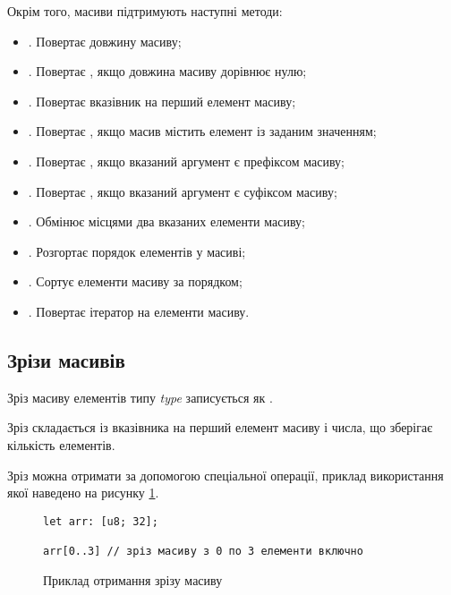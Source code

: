 \documentclass[main.tex]{subfiles}
\begin{document}
Окрім того, масиви підтримують наступні методи:
\begin{itemize}
\item {}. Повертає довжину масиву;
\item {}. Повертає , якщо довжина масиву дорівнює нулю;
\item {}. Повертає вказівник на перший елемент масиву;
\item {}. Повертає , якщо масив містить елемент із заданим значенням;
\item {}. Повертає , якщо вказаний аргумент є префіксом масиву;
\item {}. Повертає , якщо вказаний аргумент є суфіксом масиву;
\item {}. Обмінює місцями два вказаних елементи масиву;
\item {}. Розгортає порядок елементів у масиві;
\item {}. Сортує елементи масиву за порядком;
\item {}. Повертає ітератор на елементи масиву.
\end{itemize}

\FloatBarrier
\subsection{Зрізи масивів}
Зріз масиву\cite{array-slicing} елементів типу \emph{type} записується як .

Зріз складається із вказівника на перший елемент масиву і числа, що зберігає кількість елементів.

Зріз можна отримати за допомогою спеціальної операції, приклад використання якої наведено на рисунку \ref{lang:slicing}.

\begin{figure}[h]
  \centering
  \begin{verbatim}
let arr: [u8; 32];

arr[0..3] // зріз масиву з 0 по 3 елементи включно
  \end{verbatim}
  \caption{Приклад отримання зрізу масиву}
  \label{lang:slicing}
\end{figure}
\end{document}
